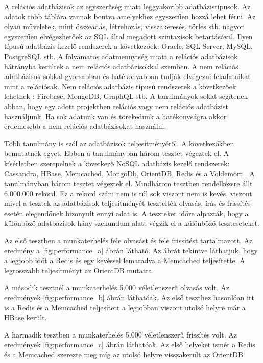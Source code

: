 A relációs adatbázisok az egyszerűség miatt leggyakoribb adatbázistípusok. Az adatok több táblára vannak bontva amelyekhez egyszerűen hozzá lehet férni. Az olyan műveletek, mint összeadás, létrehozás, visszakeresés, törlés stb. nagyon egyszerűen elvégezhetőek az SQL által megadott szintaxisok betartásával. Ilyen típusú adatbázis kezelő rendszerek a következőek: Oracle, SQL Server, MySQL, PostgreSQL stb. A folyamatos adatmennyiség miatt a relációs adatbázisok hátrányba kerültek a nem relációs adatbázisokkal szemben. A nem relációs adatbázisok sokkal gyorsabban és hatékonyabban tudják elvégezni feladataikat mint a relációsak. Nem relációs adatbázis típusú rendszerek a következőek lehetnek \cite{gupta2017nosql}: Firebase, MongoDB, GraphQL stb. A tanulmányok sokat segítenek abban, hogy egy adott projektben relációs vagy nem relációs adatbázist használjunk. Ha sok adatunk van és törekedünk a hatékonyságra akkor érdemesebb a nem relációs adatbázisokat használni. 

Több tanulmány is szól az adatbázisok teljesítményéről. A következőkben bemutatnék egyet. Ebben a tanulmányban három tesztet végeztek el. A kísérletben szerepelnek a következő NoSQL adatbázis kezelő rendszerek: Cassandra, HBase, Memcached, MongoDb, OrientDB, Redis és a Voldemort \cite{martins2019study}. A tanulmányban három tesztet végeztek el. Mindhárom tesztben rendelkézsre állt 6.000.000 rekord. Ez a rekord szám nem is túl sok viszont nem is kevés, viszont mivel a tesztek az adatbázisok teljesítményét tesztelték olvasás, írás és frissítés esetén elegendőnek bizonyult ennyi adat is. A teszteket időre alpazták, hogy a különböző adatbázisok hány szekundum alatt végzik el a különböző teszteseteket.

Az első tesztben a munkaterhelés fele olvasást és fele frissítést tartalmazott. Az eredmény a \ref{fig:performance_a} ábrán látható. Az ábrát tekíntve láthatjuk, hogy a legjobb időt a Redis és egy kevéssel lemaradva a Memcached teljesítette. A legrosszabb teljesítményt az OrientDB mutatta. 

A második tesztnél a munkaterhelés 5.000 véletlenszerű olvasás volt. Az eredmények \ref{fig:performance_b} ábrán láthatóak. Az első teszthez hasonlóan itt is a Redis és a Memcached teljesített a legjobban viszont utolsó helyre már a HBase került. 

A harmadik tesztben a munkaterhelés 5.000 véletlenszerű frissítés volt. Az eredmények \ref{fig:performance_c} ábrán láthatóak. Az első helyeket ismét a Redis és a Memcached szerezte meg míg az utolsó helyre visszakerült az OrientDB.


